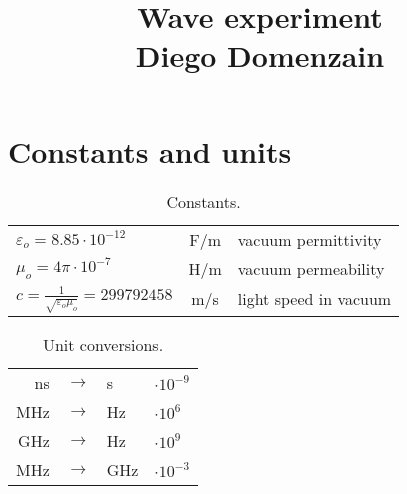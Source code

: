 \documentclass[a4paper,12pt]{article}
\title{Wave experiment\\{\normalsize Diego Domenzain}}
\author{}
\date{}
\begin{document}
\maketitle
\section*{Constants and units}
\begin{table}[!h]
\centering
\begin{tabular}{ l  c | l }
$\varepsilon_o = 8.85\cdot10^{-12}$ &  F/m & vacuum permittivity \\
$\mu_o = 4\pi\cdot 10^{-7} $ & H/m & vacuum permeability \\
$c=\frac{1}{\sqrt{\varepsilon_o\mu_o}}=299792458$ & m/s & light speed in vacuum \\
\end{tabular}
\caption{ Constants.}
 \label{tbl:ctes}
\end{table}
%
\begin{table}[!h]
\centering
\begin{tabular}{ r c l | l }
ns & $\to$ & s & $\cdot 10^{-9}$ \\
MHz & $\to$ & Hz & $\cdot 10^{6}$ \\
GHz & $\to$ & Hz & $\cdot 10^{9}$ \\
MHz & $\to$ & GHz & $\cdot 10^{-3}$ \\
\end{tabular}
\caption{ Unit conversions.}
 \label{tbl:cnvs}
\end{table}
\end{document}
